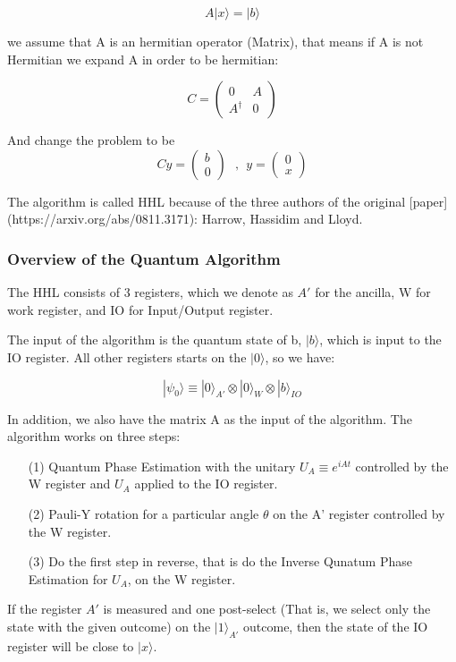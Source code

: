 $$
A | x \rangle = | b \rangle
$$

we assume that A is an hermitian operator (Matrix), that means if A is not Hermitian we expand A in order to be hermitian:

$$
C = \begin{pmatrix} 0 & A \\ A^{\dagger} & 0 \end{pmatrix}
$$

And change the problem to be $$Cy = \begin{pmatrix} b \\ 0 \end{pmatrix} \ \ \ , \ \ y = \begin{pmatrix} 0 \\ x \end{pmatrix}$$

The algorithm is called HHL because of the three authors of the original [paper](https://arxiv.org/abs/0811.3171):  Harrow, Hassidim and Lloyd. 

\subsubsection{Overview of the Quantum Algorithm}
\label{Subsubsec: Overview HHL}

The HHL consists of 3 registers, which we denote as $A'$ for the ancilla, W for work register, and IO for Input/Output register. 

The input of the algorithm is the quantum state of b, $| b \rangle$, which is input to the IO register. All other registers starts on the $| 0 \rangle$, so we have:

\begin{equation}
| \psi_0 \rangle \equiv |0 \rangle_{A'} \otimes | 0 \rangle_{W} \otimes | b \rangle_{IO}
\end{equation}

In addition, we also have the matrix A as the input of the algorithm. The algorithm works on three steps:

\begin{itemize}
    \item[(1)] Quantum Phase Estimation with the unitary $U_A \equiv e^{iAt}$ controlled by the W register and $U_A$ applied to the IO register.

    \item[(2)] Pauli-Y rotation for a particular angle $\theta$ on the A' register controlled by the W register.

    \item[(3)] Do the first step in reverse, that is do the Inverse Qunatum Phase Estimation for $U_A$, on the W register.
\end{itemize}
If the register $A'$ is measured and one post-select (That is, we select only the state with the given outcome) on the $| 1 \rangle_{A'}$ outcome, then the state of the IO register will be close to $| x \rangle$.


